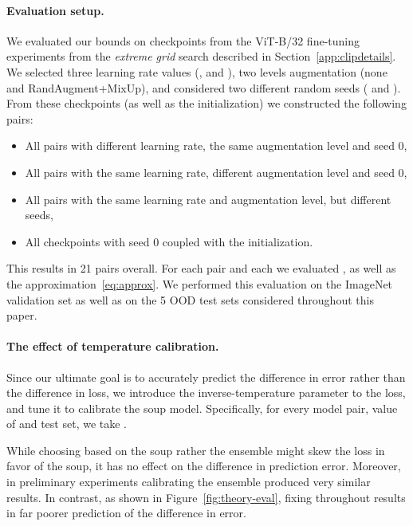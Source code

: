 \paragraph{Evaluation setup.} We evaluated our bounds on checkpoints from the ViT-B/32 fine-tuning experiments from the \emph{extreme grid} search described in Section~\ref{app:clipdetails}. We selected three learning rate values (,  and ), two levels augmentation (none and RandAugment+MixUp), and considered two different random seeds ( and ). From these checkpoints (as well as the initialization) we constructed the following  pairs:
\begin{itemize}
	\item All pairs with different learning rate, the same augmentation level and seed 0,
	\item All pairs with the same learning rate, different augmentation level and seed 0,
	\item All pairs with the same learning rate and augmentation level, but different seeds,
	\item All checkpoints with seed 0 coupled with the initialization.
\end{itemize}  
This results in 21 pairs overall. For each pair and each  we evaluated , as well as the approximation~\eqref{eq:approx}. We performed this evaluation on the ImageNet validation set as well as on the 5 OOD test sets considered throughout this paper.  

\paragraph{The effect of temperature calibration.}
Since our ultimate goal is to accurately predict the difference in error rather than the difference in loss, we introduce the inverse-temperature parameter  to the loss, and tune it to calibrate the soup model. Specifically, for every model pair, value of  and test set, we take . 

While choosing  based on the soup rather the ensemble might skew the loss in favor of the soup, it has no effect on the difference in prediction error. Moreover, in preliminary experiments calibrating the ensemble produced very similar results. In contrast, as shown in Figure~\ref{fig:theory-eval}, fixing  throughout results in far poorer prediction of the difference in error.  
